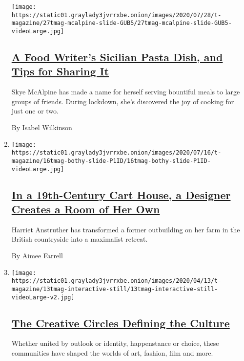 \begin{enumerate}
  \texttt{[image: https://static01.graylady3jvrrxbe.onion/images/2020/07/28/t-magazine/27tmag-mcalpine-slide-GUB5/27tmag-mcalpine-slide-GUB5-videoLarge.jpg]}

  \hypertarget{a-food-writers-sicilian-pasta-dish-and-tips-for-sharing-it}{%
  \subsection{\texorpdfstring{\href{/2020/07/29/t-magazine/skye-mcalpine-pasta-cooking.html}{A
  Food Writer's Sicilian Pasta Dish, and Tips for Sharing
  It}}{A Food Writer's Sicilian Pasta Dish, and Tips for Sharing It}}\label{a-food-writers-sicilian-pasta-dish-and-tips-for-sharing-it}}

  Skye McAlpine has made a name for herself serving bountiful meals to
  large groups of friends. During lockdown, she's discovered the joy of
  cooking for just one or two.

  By Isabel Wilkinson
\item
  \texttt{[image: https://static01.graylady3jvrrxbe.onion/images/2020/07/16/t-magazine/16tmag-bothy-slide-P1ID/16tmag-bothy-slide-P1ID-videoLarge.jpg]}

  \hypertarget{in-a-19th-century-cart-house-a-designer-creates-a-room-of-her-own}{%
  \subsection{\texorpdfstring{\href{/2020/07/31/t-magazine/design-bothy-anstruther.html}{In
  a 19th-Century Cart House, a Designer Creates a Room of Her
  Own}}{In a 19th-Century Cart House, a Designer Creates a Room of Her Own}}\label{in-a-19th-century-cart-house-a-designer-creates-a-room-of-her-own}}

  Harriet Anstruther has transformed a former outbuilding on her farm in
  the British countryside into a maximalist retreat.

  By Aimee Farrell
\item
  \texttt{[image: https://static01.graylady3jvrrxbe.onion/images/2020/04/13/t-magazine/13tmag-interactive-still/13tmag-interactive-still-videoLarge-v2.jpg]}

  \hypertarget{the-creative-circles-defining-the-culture}{%
  \subsection{\texorpdfstring{\href{/interactive/2020/04/13/t-magazine/culture-issue-2020.html}{The
  Creative Circles Defining the
  Culture}}{The Creative Circles Defining the Culture}}\label{the-creative-circles-defining-the-culture}}

  Whether united by outlook or identity, happenstance or choice, these
  communities have shaped the worlds of art, fashion, film and more.
\end{enumerate}

